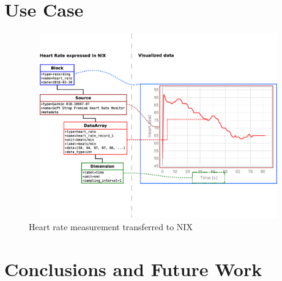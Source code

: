 \documentclass[conference]{IEEEconf}
\begin{document}
\section{Use Case}\label{sec:use-case}

\begin{figure}
\centering\includegraphics[width=13cm, height=8cm]{NIX-example}
\caption{\label{NIX-ex}Heart rate measurement transferred to NIX}
\end{figure}

\section{Conclusions and Future Work}\label{sec:future-work}








\end{document}
